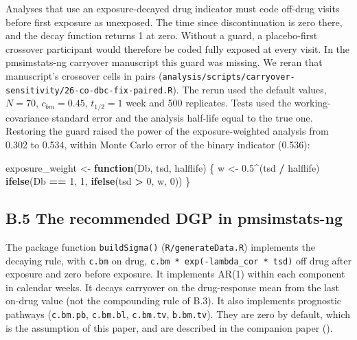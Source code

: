 \documentclass[
  11pt,
]{article}
\newenvironment{Shaded}{\begin{snugshade}}{\end{snugshade}}
\newcommand{\ControlFlowTok}[1]{\textcolor[rgb]{0.13,0.29,0.53}{\textbf{#1}}}
\newcommand{\DecValTok}[1]{\textcolor[rgb]{0.00,0.00,0.81}{#1}}
\newcommand{\FloatTok}[1]{\textcolor[rgb]{0.00,0.00,0.81}{#1}}
\newcommand{\FunctionTok}[1]{\textcolor[rgb]{0.13,0.29,0.53}{\textbf{#1}}}
\newcommand{\NormalTok}[1]{#1}
\newcommand{\OtherTok}[1]{\textcolor[rgb]{0.56,0.35,0.01}{#1}}
\newcommand{\SpecialCharTok}[1]{\textcolor[rgb]{0.81,0.36,0.00}{\textbf{#1}}}
\begin{document}
Analyses that use an exposure-decayed drug indicator must code
off-drug visits before first exposure as unexposed. The time since
discontinuation is zero there, and the decay function returns 1 at
zero. Without a guard, a placebo-first crossover participant would
therefore be coded fully exposed at every visit. In the pmsimstats-ng
carryover manuscript this guard was missing. We reran that
manuscript's crossover cells in pairs
(\texttt{analysis/scripts/carryover-sensitivity/26-co-dbc-fix-paired.R}).
The rerun used the default values, \(N = 70\), \(c_{bm} = 0.45\),
\(t_{1/2} = 1\) week and 500 replicates. Tests used the
working-covariance standard error and the analysis half-life equal to
the true one. Restoring the guard raised the power of the
exposure-weighted analysis from 0.302 to 0.534,
within Monte Carlo error of the binary indicator (0.536):

\begin{Shaded}
\begin{Highlighting}[]
\NormalTok{exposure\_weight }\OtherTok{\textless{}{-}} \ControlFlowTok{function}\NormalTok{(Db, tsd, halflife) \{}
\NormalTok{  w }\OtherTok{\textless{}{-}} \FloatTok{0.5}\SpecialCharTok{\^{}}\NormalTok{(tsd }\SpecialCharTok{/}\NormalTok{ halflife)}
  \FunctionTok{ifelse}\NormalTok{(Db }\SpecialCharTok{==} \DecValTok{1}\NormalTok{, }\DecValTok{1}\NormalTok{, }\FunctionTok{ifelse}\NormalTok{(tsd }\SpecialCharTok{\textgreater{}} \DecValTok{0}\NormalTok{, w, }\DecValTok{0}\NormalTok{))}
\NormalTok{\}}
\end{Highlighting}
\end{Shaded}

\subsection*{B.5 The recommended DGP in pmsimstats-ng}\label{b.5-the-recommended-dgp-in-pmsimstats-ng}

The package function \texttt{buildSigma()} (\texttt{R/generateData.R}) implements
the decaying rule, with \texttt{c.bm} on drug,
\texttt{c.bm\ *\ exp(-lambda\_cor\ *\ tsd)} off drug after exposure and zero
before exposure. It implements AR(1) within each component in
calendar weeks. It decays carryover on the drug-response mean from the
last on-drug value (not the compounding rule of B.3). It also implements
prognostic pathways (\texttt{c.bm.pb}, \texttt{c.bm.bl}, \texttt{c.bm.tv}, \texttt{b.bm.tv}). They
are zero by default, which is the assumption of this paper, and are
described in the companion paper ().
\end{document}
